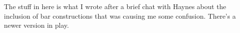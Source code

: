 \documentclass[10pt]{article}
\newcommand{\PRLie}[1]%
{\ifblank{#1}{\scrR}{\scrR^{#1}}}
\newcommand{\LL}[1]{\ifblank{#1}{\scrK}{\scrK^{#1}}}
\newcommand{\GR}[1]{\ifblank{#1}{\scrV}{\scrV^{#1}}}
\newcommand{\nontop}[1]{\ifblank{#1}{\scrU}{\scrU^{#1}}}
\newcommand{\Boverline}{\smash{\overline{B}}\rule{0mm}{\heightof{\ensuremath{B}}}}
\newcommand{\Ind}[2][]{\ifblank{#1}{\mathbf{I}^{\smash{\mbox{\tiny $#2$}}}}{\mathbf{I}^{\mbox{\tiny $#2$}}_{#1}}}%
\newcommand{\forgetSymbol}{\mathrm{fg}}
\newcommand{\forget}[1]{\mathrm{fg}_{\smash{\mbox{\tiny $#1$}}}}
\newcommand{\Fr}[2][]{\ifblank{#1}{#2}{#2_{#1}}}
\newcommand{\derived}{\mathbb{L}}
\begin{document}
\begin{ConversationWithHaynes_InclusionOfBarConstructions}
The stuff in here is what I wrote after a brief chat with Haynes about the inclusion of bar constructions that was causing me some confusion. There's a newer version in play.
%

\end{ConversationWithHaynes_InclusionOfBarConstructions}
\end{document}
